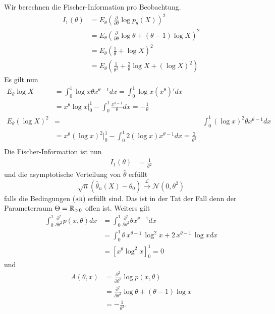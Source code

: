 Wir berechnen die Fischer-Information pro Beobachtung. 
\begin{align*}
    I_1(\theta) &= E_\theta \left( \frac{\partial}{\partial \theta} \log p_\theta(X) \right)^2 \\
    &= E_\theta \left( \frac{\partial}{\partial\theta} \log \theta + (\theta-1) \log X \right)^2 \\
    &= E_\theta \left( \frac{1}{\theta} + \log X \right)^2 \\
    &= E_\theta \left( \frac{1}{\theta^2} + \frac{2}{\theta} \log X + (\log X)^2 \right)
\end{align*}
Es gilt nun
\begin{align*}
    E_\theta \log X &=  \int_{0}^{1} \log x \theta x^{\theta-1} dx = \int_{0}^{1} \log x (x^{\theta})' dx \\
    &= x^\theta \log x \Big|_0^1 - \int_{0}^{1} \frac{x^{\theta-1}}{\theta} dx = - \frac{1}{\theta} \\
    E_\theta (\log X)^2 &=&  \int_{0}^{1} (\log x)^2 \theta x^{\theta-1} dx \\ 
    &= x^\theta (\log x)^2 \Big|_0^1 - \int_{0}^{1} 2(\log x) x^{\theta-1} dx = \frac{2}{\theta^2} \\
\end{align*}
Die Fischer-Information ist nun
\begin{align*}
    I_1(\theta) &= \frac{1}{\theta^2}
\end{align*}
und die asymptotische Verteilung von $\hat \theta$ erfüllt
\begin{equation*}
    \sqrt{n}\left( \hat\theta_n(X) - \theta_0 \right) \xrightarrow{\mathcal{L}} \mathcal N(0, \theta^2)
\end{equation*}
falls die Bedingungen \textsc{(ar)} erfüllt sind. Das ist in der Tat der Fall denn der Parameterraum
$\Theta=\mathbb R_{>0}$ offen ist. Weiters gilt
\begin{align*}
    \int_{0}^{1} \frac{\partial^2}{\partial\theta^2} p(x,\theta) dx &= 
    \int_{0}^{1} \frac{\partial^2}{\partial\theta^2} \theta x^{\theta-1} dx \\
    &= \int_{0}^{1} \theta\,x^{\theta-1}\,\log ^2x+2\,x^{\theta-1}\,\log x dx\\
    &= \left[   x^{\theta} \log^2x  \right]_0^1 = 0
\end{align*}
und
\begin{align*}
    A(\theta,x) &= \frac{\partial^2}{\partial \theta^2} \log p(x,\theta) \\
    &= \frac{\partial^2}{\partial \theta^2} \log \theta + (\theta-1) \log x \\
    &= -\frac{1}{\theta ^2}. 
\end{align*}
